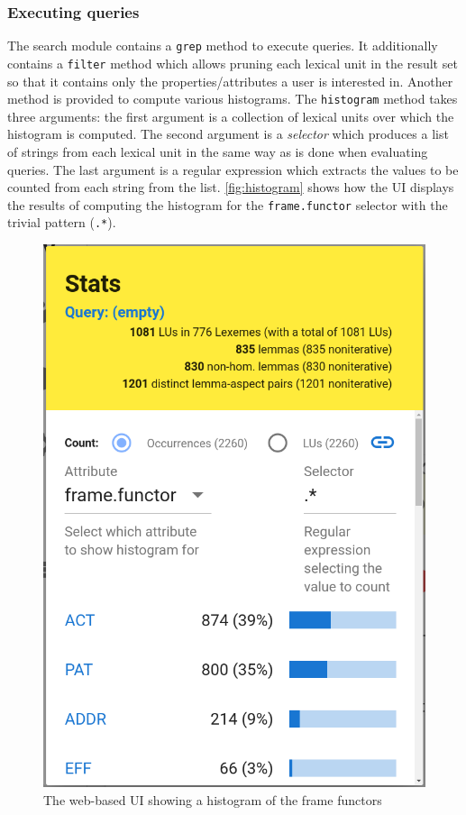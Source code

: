 \documentclass[10pt, a4paper]{article}
\newcommand{\py}[1]{{\tt #1}}
\begin{document}
\subsubsection{Executing queries}\label{sec:execute_query}
The search module contains a \py{grep} method to execute queries. It additionally contains a \py{filter}
method which allows pruning each lexical unit in the result set so that it contains only the properties/attributes a user is interested in. Another method is provided to compute various histograms.
The \py{histogram} method takes three arguments: the first argument is a collection of lexical units over which the histogram is computed. The second argument is a \emph{selector} which produces a list of strings
from each lexical unit in the same way as is done when evaluating queries. The last argument is a
regular expression which extracts the values to be counted from each string from the list. \autoref{fig:histogram}
shows how the UI displays the results of computing the histogram for the {\tt frame.functor} selector with
the trivial pattern ({\tt .*}).
\begin{figure}
    \includegraphics[width=\hsize]{images/histogram.png}
    \caption{\label{fig:histogram}The web-based UI showing a histogram of the frame functors}
\end{figure}
\end{document}
